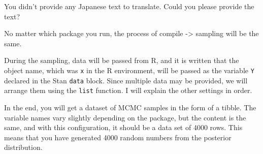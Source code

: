 \documentclass{ltjsbook}
\begin{document}

You didn't provide any Japanese text to translate. Could you please provide the text?



No matter which package you run, the process of compile -> sampling will be the same.

During the sampling, data will be passed from R, and it is written that the object name, which was \texttt{x} in the R environment, will be passed as the variable \texttt{Y} declared in the Stan \texttt{data} block. Since multiple data may be provided, we will arrange them using the \texttt{list} function. I will explain the other settings in order.

In the end, you will get a dataset of MCMC samples in the form of a tibble. The variable names vary slightly depending on the package, but the content is the same, and with this configuration, it should be a data set of 4000 rows. This means that you have generated 4000 random numbers from the posterior distribution.
\end{document}
